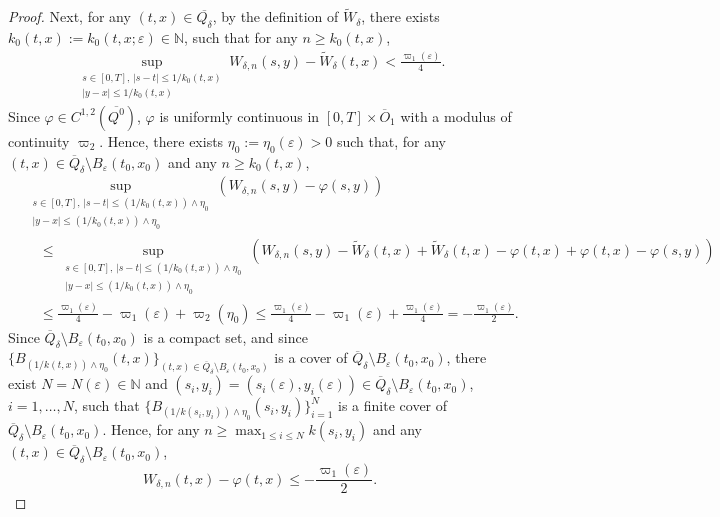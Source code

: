 \documentclass[amscd,amssymb,11pt]{article}
\numberwithin{theorem}{section}
\numberwithin{equation}{section}
\begin{document}
\begin{proof}
Next, for any $(t,x)\in \overline{Q_{\delta}}$, by the definition of $\widetilde{W}_{\delta}$, there exists $k_{0}(t,x):=k_{0}(t,x;\varepsilon)\in\mathbb{N}$, such that for any $n\geq k_{0}(t,x)$,
\begin{align*}
\sup_{\substack{s\in[0,T],\,|s-t|\leq 1/k_{0}(t,x) \\ |y-x|\leq 1/k_{0}(t,x)}}W_{\delta,n}(s,y)-\widetilde{W}_{\delta}(t,x)<\frac{\varpi_{1}(\varepsilon)}{4}.
\end{align*}
Since $\varphi\in C^{1,2}(\overline{Q^{0}})$, $\varphi$ is uniformly continuous in $[0,T]\times\overline{O}_{1}$ with a modulus of continuity $\varpi_{2}$. Hence, there exists $\eta_{0}:=\eta_{0}(\varepsilon)>0$ such that, for any $(t,x)\in\overline{Q}_{\delta}\setminus B_{\varepsilon}(t_{0},x_{0})$ and any $n\geq k_{0}(t,x)$,
\begin{align*}
&\sup_{\substack{s\in[0,T],\,|s-t|\leq(1/k_{0}(t,x))\wedge\eta_{0} \\ |y-x|\leq(1/k_{0}(t,x))\wedge\eta_{0}}}\left(W_{\delta,n}(s,y)-\varphi(s,y)\right)\\
&\quad\leq\sup_{\substack{s\in[0,T],\,|s-t|\leq(1/k_{0}(t,x))\wedge\eta_{0} \\ |y-x|\leq(1/k_{0}(t,x))\wedge\eta_{0}}}\left(W_{\delta,n}(s,y)-\widetilde{W}_{\delta}(t,x)+\widetilde{W}_{\delta}(t,x)-\varphi(t,x)+\varphi(t,x)-\varphi(s,y)\right)\\
&\quad\leq\frac{\varpi_{1}(\varepsilon)}{4}-\varpi_{1}(\varepsilon)+\varpi_{2}(\eta_{0})\leq\frac{\varpi_{1}(\varepsilon)}{4}-\varpi_{1}(\varepsilon)+\frac{\varpi_{1}(\varepsilon)}{4}=-\frac{\varpi_{1}(\varepsilon)}{2}.
\end{align*}
Since $\overline{Q}_{\delta}\setminus B_{\varepsilon}( t_{0},x_{0})$ is a compact set, and since $\{B_{(1/k(t,x))\wedge\eta_{0}}(t,x)\}_{(t,x)\in\overline{Q}_{\delta}\setminus B_{\varepsilon}(t_{0},x_{0})}$ is a cover of $\overline{Q}_{\delta}\setminus B_{\varepsilon}(t_{0},x_{0})$, there exist $N=N(\varepsilon)\in\mathbb{N}$ and $(s_{i},y_{i})=(s_{i}(\varepsilon),y_{i}(\varepsilon))\in\overline{Q}_{\delta}\setminus B_{\varepsilon}(t_{0},x_{0})$, $i=1,\ldots,N$, such that $\{B_{(1/k(s_{i},y_{i}))\wedge\eta_{0}}(s_{i},y_{i})\}_{i=1}^N$ is a finite cover of $\overline{Q}_{\delta}\setminus B_{\varepsilon}(t_{0},x_{0})$. Hence, for any $n\geq \max_{1\leq i\leq N}k(s_{i},y_{i})$ and any $(t,x)\in\overline{Q}_{\delta}\setminus B_{\varepsilon}(t_{0},x_{0})$,
\begin{equation*}
W_{\delta,n}(t,x)-\varphi(t,x)\leq -\frac{\varpi_{1}(\varepsilon)}{2}.
\end{equation*}


\end{proof}
\end{document}
